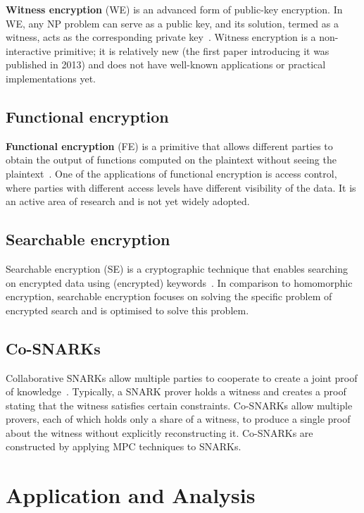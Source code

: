 \documentclass[
    9pt,            %
    report,        %
    affiltop,       %
]{art}
\begin{document}
\textbf{Witness encryption} (WE) is an advanced form of public-key encryption.
In WE, any NP problem can serve as a public key, and its solution, termed as a
witness, acts as the corresponding private key~\citep{we}. Witness encryption
is a non-interactive primitive; it is relatively new (the first paper
introducing it was published in 2013) and does not have well-known applications
or practical implementations yet.

\subsection{Functional encryption}\label{FE}

\textbf{Functional encryption} (FE) is a primitive that allows different parties
to obtain the output of functions computed on the plaintext without seeing the
plaintext~\citep{fe}. One of the applications of functional encryption is access
control, where parties with different access levels have different visibility of
the data. It is an active area of research and is not yet widely adopted.

\subsection{Searchable encryption }\label{SE}

Searchable encryption (SE) is a cryptographic technique that enables searching
on encrypted data using (encrypted) keywords~\citep{se}. In comparison to
homomorphic encryption, searchable encryption focuses on solving the specific
problem of encrypted search and is optimised to solve this problem.


\subsection{Co-SNARKs}\label{CoSNARKs}

Collaborative SNARKs allow multiple parties to cooperate to create a joint proof of knowledge~\citep{cosnarks}. Typically, a SNARK prover holds a witness and creates a proof stating that the witness satisfies certain constraints. Co-SNARKs allow multiple provers, each of which holds only a share of a witness, to produce a single proof about the witness without explicitly reconstructing it. Co-SNARKs are constructed by applying MPC techniques to SNARKs.

\section{Application and Analysis}\label{analysis}
\end{document}
